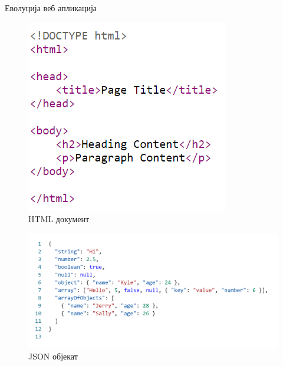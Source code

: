 \documentclass[aspectratio=169]{beamer}
\begin{document}
\begin{frame}[allowframebreaks]{Еволуција веб апликација}
        \begin{figure}
            \centering
            \includegraphics[width=\textwidth,height=0.7\textheight,keepaspectratio]{images/html.png}
            \caption{HTML документ}
            \label{fig:html}
        \end{figure}
        
        \framebreak
        
        \begin{figure}
            \centering
            \includegraphics[width=\textwidth,height=0.7\textheight,keepaspectratio]{images/json.png}
            \caption{JSON објекат}
            \label{fig:json}
        \end{figure}
    \end{frame}
    
\end{document}
